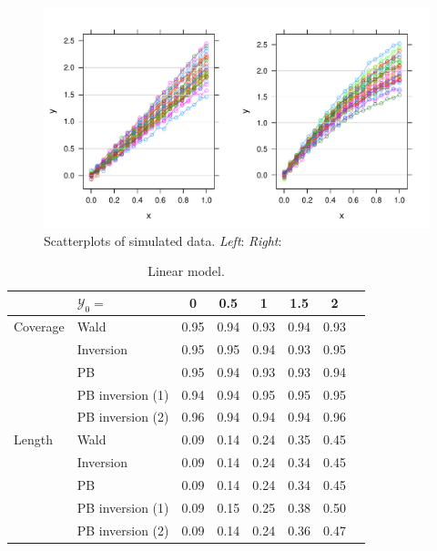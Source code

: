 \documentclass[cmfont,usenames,dvipsnames,leqno]{afit-etd}\usepackage[]{graphicx}\usepackage[]{color}
\makeatletter
\def\maxwidth{ %
  \ifdim\Gin@nat@width>\linewidth
    \linewidth
  \else
    \Gin@nat@width
  \fi
}
\newenvironment{knitrout}{}{} %
\renewenvironment{knitrout}{\begin{singlespace}}{\end{singlespace}}
\makeatother
\begin{document}
\begin{knitrout}
\color{fgcolor}\begin{figure}[!tbh]

\includegraphics[width=\maxwidth]{figure/simdata-scatterplots} \caption[Scatterplots of simulated data]{Scatterplots of simulated data. \textit{Left}: \textit{Right}:\label{fig:simdata-scatterplots}}
\end{figure}


\end{knitrout}


\begin{table}[!htb]
\caption[Linear model]{Linear model. \label{tab:linear-results}}
\centering
  \begin{tabular}{llcccccc}
  \toprule
            &  $\mathcal{Y}_0 =$ & 0    & 0.5  & 1    & 1.5  & 2    \\
  \hline
  Coverage  &  Wald              & 0.95 & 0.94 & 0.93 & 0.94 & 0.93 \\
            &  Inversion         & 0.95 & 0.95 & 0.94 & 0.93 & 0.95 \\
            &  PB                & 0.95 & 0.94 & 0.93 & 0.93 & 0.94 \\
            &  PB inversion (1)  & 0.94 & 0.94 & 0.95 & 0.95 & 0.95 \\
  					&  PB inversion (2)  & 0.96 & 0.94 & 0.94 & 0.94 & 0.96 \\
  \hline
  Length    &  Wald              & 0.09 & 0.14 & 0.24 & 0.35 & 0.45 \\
            &  Inversion         & 0.09 & 0.14 & 0.24 & 0.34 & 0.45 \\
            &  PB                & 0.09 & 0.14 & 0.24 & 0.34 & 0.45 \\
            &  PB inversion (1)  & 0.09 & 0.15 & 0.25 & 0.38 & 0.50 \\
						&  PB inversion (2)  & 0.09 & 0.14 & 0.24 & 0.36 & 0.47 \\
  \bottomrule
  \end{tabular}
\end{table}
\end{document}
